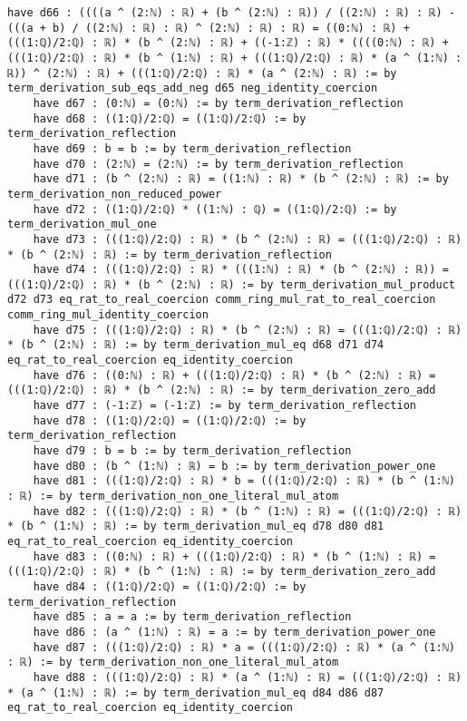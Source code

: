 \documentclass{article}
\begin{document}
\begin{tcolorbox}[colback=white!10, width=\linewidth]
\begin{lstlisting}[language=Lean4]
    have d66 : ((((a ^ (2:ℕ) : ℝ) + (b ^ (2:ℕ) : ℝ)) / ((2:ℕ) : ℝ) : ℝ) - (((a + b) / ((2:ℕ) : ℝ) : ℝ) ^ (2:ℕ) : ℝ) : ℝ) = ((0:ℕ) : ℝ) + (((1:ℚ)/2:ℚ) : ℝ) * (b ^ (2:ℕ) : ℝ) + ((-1:ℤ) : ℝ) * ((((0:ℕ) : ℝ) + (((1:ℚ)/2:ℚ) : ℝ) * (b ^ (1:ℕ) : ℝ) + (((1:ℚ)/2:ℚ) : ℝ) * (a ^ (1:ℕ) : ℝ)) ^ (2:ℕ) : ℝ) + (((1:ℚ)/2:ℚ) : ℝ) * (a ^ (2:ℕ) : ℝ) := by term_derivation_sub_eqs_add_neg d65 neg_identity_coercion
    have d67 : (0:ℕ) = (0:ℕ) := by term_derivation_reflection
    have d68 : ((1:ℚ)/2:ℚ) = ((1:ℚ)/2:ℚ) := by term_derivation_reflection
    have d69 : b = b := by term_derivation_reflection
    have d70 : (2:ℕ) = (2:ℕ) := by term_derivation_reflection
    have d71 : (b ^ (2:ℕ) : ℝ) = ((1:ℕ) : ℝ) * (b ^ (2:ℕ) : ℝ) := by term_derivation_non_reduced_power
    have d72 : ((1:ℚ)/2:ℚ) * ((1:ℕ) : ℚ) = ((1:ℚ)/2:ℚ) := by term_derivation_mul_one
    have d73 : (((1:ℚ)/2:ℚ) : ℝ) * (b ^ (2:ℕ) : ℝ) = (((1:ℚ)/2:ℚ) : ℝ) * (b ^ (2:ℕ) : ℝ) := by term_derivation_reflection
    have d74 : (((1:ℚ)/2:ℚ) : ℝ) * (((1:ℕ) : ℝ) * (b ^ (2:ℕ) : ℝ)) = (((1:ℚ)/2:ℚ) : ℝ) * (b ^ (2:ℕ) : ℝ) := by term_derivation_mul_product d72 d73 eq_rat_to_real_coercion comm_ring_mul_rat_to_real_coercion comm_ring_mul_identity_coercion
    have d75 : (((1:ℚ)/2:ℚ) : ℝ) * (b ^ (2:ℕ) : ℝ) = (((1:ℚ)/2:ℚ) : ℝ) * (b ^ (2:ℕ) : ℝ) := by term_derivation_mul_eq d68 d71 d74 eq_rat_to_real_coercion eq_identity_coercion
    have d76 : ((0:ℕ) : ℝ) + (((1:ℚ)/2:ℚ) : ℝ) * (b ^ (2:ℕ) : ℝ) = (((1:ℚ)/2:ℚ) : ℝ) * (b ^ (2:ℕ) : ℝ) := by term_derivation_zero_add
    have d77 : (-1:ℤ) = (-1:ℤ) := by term_derivation_reflection
    have d78 : ((1:ℚ)/2:ℚ) = ((1:ℚ)/2:ℚ) := by term_derivation_reflection
    have d79 : b = b := by term_derivation_reflection
    have d80 : (b ^ (1:ℕ) : ℝ) = b := by term_derivation_power_one
    have d81 : (((1:ℚ)/2:ℚ) : ℝ) * b = (((1:ℚ)/2:ℚ) : ℝ) * (b ^ (1:ℕ) : ℝ) := by term_derivation_non_one_literal_mul_atom
    have d82 : (((1:ℚ)/2:ℚ) : ℝ) * (b ^ (1:ℕ) : ℝ) = (((1:ℚ)/2:ℚ) : ℝ) * (b ^ (1:ℕ) : ℝ) := by term_derivation_mul_eq d78 d80 d81 eq_rat_to_real_coercion eq_identity_coercion
    have d83 : ((0:ℕ) : ℝ) + (((1:ℚ)/2:ℚ) : ℝ) * (b ^ (1:ℕ) : ℝ) = (((1:ℚ)/2:ℚ) : ℝ) * (b ^ (1:ℕ) : ℝ) := by term_derivation_zero_add
    have d84 : ((1:ℚ)/2:ℚ) = ((1:ℚ)/2:ℚ) := by term_derivation_reflection
    have d85 : a = a := by term_derivation_reflection
    have d86 : (a ^ (1:ℕ) : ℝ) = a := by term_derivation_power_one
    have d87 : (((1:ℚ)/2:ℚ) : ℝ) * a = (((1:ℚ)/2:ℚ) : ℝ) * (a ^ (1:ℕ) : ℝ) := by term_derivation_non_one_literal_mul_atom
    have d88 : (((1:ℚ)/2:ℚ) : ℝ) * (a ^ (1:ℕ) : ℝ) = (((1:ℚ)/2:ℚ) : ℝ) * (a ^ (1:ℕ) : ℝ) := by term_derivation_mul_eq d84 d86 d87 eq_rat_to_real_coercion eq_identity_coercion

\end{lstlisting}
\end{tcolorbox}
\end{document}
